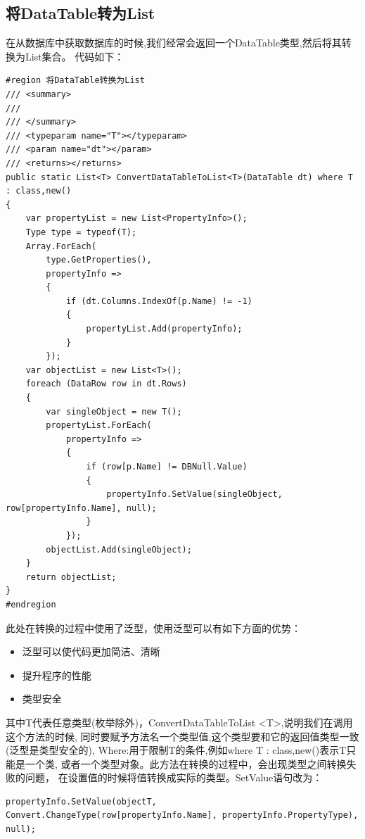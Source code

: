 \documentclass{book}
\begin{document}
\subsection{将DataTable转为List}

在从数据库中获取数据库的时候,我们经常会返回一个DataTable类型,然后将其转换为List集合。
代码如下：

\begin{lstlisting}[language={[Sharp]C},caption=将DataTable转换为List]
#region 将DataTable转换为List
/// <summary>
/// 
/// </summary>
/// <typeparam name="T"></typeparam>
/// <param name="dt"></param>
/// <returns></returns>
public static List<T> ConvertDataTableToList<T>(DataTable dt) where T : class,new()
{
    var propertyList = new List<PropertyInfo>();
    Type type = typeof(T);
    Array.ForEach(
        type.GetProperties(),
        propertyInfo =>
        {
            if (dt.Columns.IndexOf(p.Name) != -1)
            {
                propertyList.Add(propertyInfo);
            }
        });
    var objectList = new List<T>();
    foreach (DataRow row in dt.Rows)
    {
        var singleObject = new T();
        propertyList.ForEach(
            propertyInfo =>
            {
                if (row[p.Name] != DBNull.Value)
                {
                    propertyInfo.SetValue(singleObject, row[propertyInfo.Name], null);
                }
            });
        objectList.Add(singleObject);
    }
    return objectList;
}
#endregion
\end{lstlisting}

此处在转换的过程中使用了泛型，使用泛型可以有如下方面的优势：

\begin{itemize}
\item{泛型可以使代码更加简洁、清晰}
\item{提升程序的性能}
\item{类型安全}
\end{itemize}

其中T代表任意类型(枚举除外)，ConvertDataTableToList <T>,说明我们在调用这个方法的时候,
同时要赋予方法名一个类型值,这个类型要和它的返回值类型一致(泛型是类型安全的),
Where:用于限制T的条件,例如where T : class,new()表示T只能是一个类,
或者一个类型对象。此方法在转换的过程中，会出现类型之间转换失败的问题，
在设置值的时候将值转换成实际的类型。SetValue语句改为：

\begin{lstlisting}[language={[Sharp]C}]
propertyInfo.SetValue(objectT, Convert.ChangeType(row[propertyInfo.Name], propertyInfo.PropertyType), null);
\end{lstlisting}
\end{document}
